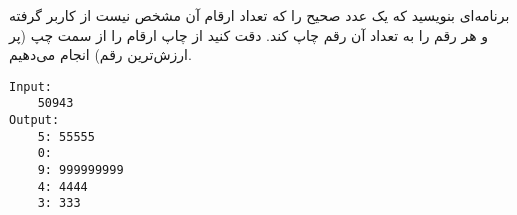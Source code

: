 
برنامه‌ای بنويسيد كه یک عدد صحيح را که تعداد ارقام آن مشخص نیست از کاربر گرفته و هر رقم را به تعداد آن رقم چاپ کند.
دقت کنید از چاپ ارقام را از سمت چپ (پر ارزش‌ترین رقم) انجام می‌دهیم.

\begin{latin}
\begin{verbatim}
Input:
    50943
Output:
    5: 55555
    0:
    9: 999999999
    4: 4444
    3: 333
\end{verbatim}
\end{latin}
